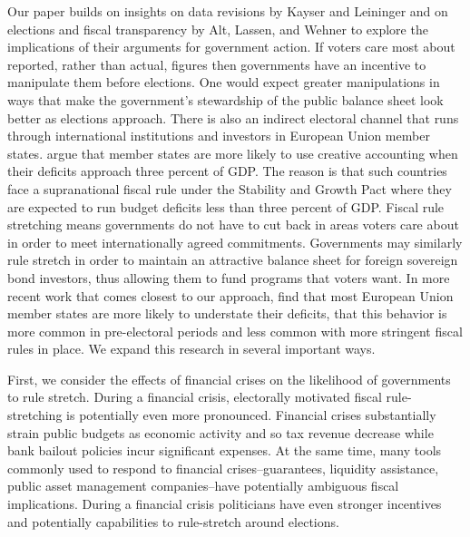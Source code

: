 \documentclass[]{article}
\begin{document}
Our paper builds on insights on data revisions by Kayser and Leininger and on elections and fiscal transparency by Alt, Lassen, and Wehner to explore the implications of their arguments for government action.  If voters care most about reported, rather than actual, figures then governments have an incentive to manipulate them before elections. One would expect greater manipulations in ways that make the government's stewardship of the public balance sheet look better as elections approach. There is also an indirect electoral channel that runs through international institutions and investors in European Union member states. \cite{vonHagenWolff2006} argue that member states are more likely to use creative accounting when their deficits approach three percent of GDP. The reason is that such countries face a supranational fiscal rule under the Stability and Growth Pact where they are expected to run budget deficits less than three percent of GDP. Fiscal rule stretching means governments do not have to cut back in areas voters care about in order to meet internationally agreed commitments. Governments may similarly rule stretch in order to maintain an attractive balance sheet for foreign sovereign bond investors, thus allowing them to fund programs that voters want. In more recent work that comes closest to our approach, \cite{DeCastro2013} find that most European Union member states are more likely to understate their deficits, that this behavior is more common in pre-electoral periods and less common with more stringent fiscal rules in place. We expand this research in several important ways.

First, we consider the effects of financial crises on the likelihood of governments to rule stretch. During a financial crisis, electorally motivated fiscal rule-stretching is potentially even more pronounced. Financial crises substantially strain public budgets as economic activity and so tax revenue decrease while bank bailout policies incur significant expenses. At the same time, many tools commonly used to respond to financial crises--guarantees, liquidity assistance, public asset management companies--have potentially ambiguous fiscal implications. During a financial crisis politicians have even stronger incentives and potentially capabilities to rule-stretch around elections.
\end{document}
